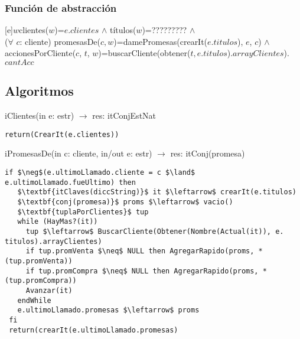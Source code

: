 \subsubsection{Funci\'on de abstracci\'on}
  	 [e]{$w$}{clientes($w$)=$e.clientes$ $\land$ t\'itulos($w$)=????????? $\land$ \\($\forall$ $c$: cliente) promesasDe($c, w$)=damePromesas(crearIt($e.titulos$), $e$, $c$) $\land$ \\accionesPorCliente($c$, $t$, $w$)=buscarCliente(obtener($t, e.titulos$).$arrayClientes$).$cantAcc$}



\subsection{Algoritmos}
\lstset { %
    showstringspaces=false,
}
iClientes(in e: estr) $\rightarrow$ res: itConjEstNat
\begin{lstlisting}[mathescape]
  return(CrearIt(e.clientes))
\end{lstlisting}


iPromesasDe(in c: cliente, in/out e: estr) $\rightarrow$ res: itConj(promesa)
\begin{lstlisting}[mathescape]
 if $\neg$(e.ultimoLlamado.cliente = c $\land$ e.ultimoLlamado.fueUltimo) then
   $\textbf{itClaves(diccString)}$ it $\leftarrow$ crearIt(e.titulos)
   $\textbf{conj(promesa)}$ proms $\leftarrow$ vacio() 
   $\textbf{tuplaPorClientes}$ tup
   while (HayMas?(it))
     tup $\leftarrow$ BuscarCliente(Obtener(Nombre(Actual(it)), e. titulos).arrayClientes)
     if tup.promVenta $\neq$ NULL then AgregarRapido(proms, *(tup.promVenta))
     if tup.promCompra $\neq$ NULL then AgregarRapido(proms, *(tup.promCompra))
     Avanzar(it)
   endWhile
   e.ultimoLlamado.promesas $\leftarrow$ proms
 fi
 return(crearIt(e.ultimoLlamado.promesas)
\end{lstlisting}

